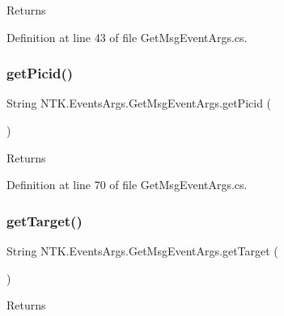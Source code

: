 \begin{DoxyReturn}{Returns}

\end{DoxyReturn}


Definition at line 43 of file Get\+Msg\+Event\+Args.\+cs.

\mbox{\label{class_n_t_k_1_1_events_args_1_1_get_msg_event_args_a17bf9d90a6147cb45467dc7b876f68e7}} 
\subsubsection{\texorpdfstring{getPicid()}{getPicid()}}
{\footnotesize\ttfamily String N\+T\+K.\+Events\+Args.\+Get\+Msg\+Event\+Args.\+get\+Picid (\begin{DoxyParamCaption}{ }\end{DoxyParamCaption})}





\begin{DoxyReturn}{Returns}

\end{DoxyReturn}


Definition at line 70 of file Get\+Msg\+Event\+Args.\+cs.

\mbox{\label{class_n_t_k_1_1_events_args_1_1_get_msg_event_args_ae1cc1aca5b73743c903247af4b300c80}} 
\subsubsection{\texorpdfstring{getTarget()}{getTarget()}}
{\footnotesize\ttfamily String N\+T\+K.\+Events\+Args.\+Get\+Msg\+Event\+Args.\+get\+Target (\begin{DoxyParamCaption}{ }\end{DoxyParamCaption})}





\begin{DoxyReturn}{Returns}

\end{DoxyReturn}


